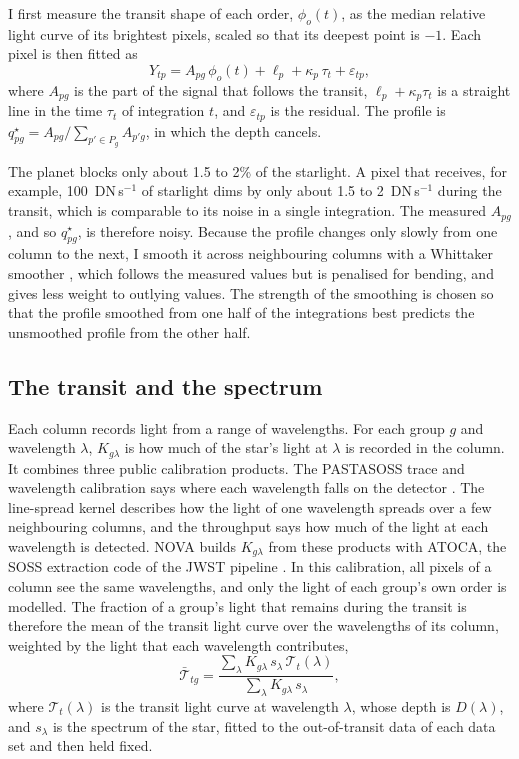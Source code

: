 I first measure the transit shape of each order, $\phi_o(t)$, as the median
relative light curve of its brightest pixels, scaled so that its deepest point
is $-1$. Each pixel is then fitted as
\begin{equation}
 Y_{tp} = A_{pg}\,\phi_{o}(t) + \ell_p + \kappa_p\,\tau_t + \varepsilon_{tp},
 \label{eq:qstar-fit}
\end{equation}
where $A_{pg}$ is the part of the signal that follows the transit,
$\ell_p+\kappa_p\tau_t$ is a straight line in the time $\tau_t$ of integration
$t$, and $\varepsilon_{tp}$ is the residual. The profile is $q^\star_{pg}=A_{pg}/\sum_{p'\in P_g}A_{p'g}$, in
which the depth cancels.

The planet blocks only about 1.5 to 2\% of the starlight. A pixel that
receives, for example, 100~DN\,s$^{-1}$ of starlight dims by only about 1.5
to 2~DN\,s$^{-1}$ during the transit, which is comparable to its noise in a single
integration. The measured $A_{pg}$, and so $q^\star_{pg}$, is therefore
noisy. Because the profile changes only slowly from one column to the next, I
smooth it across neighbouring columns with a Whittaker smoother \citep{Eilers2003}, which follows the measured values but is penalised for bending, and gives less weight to outlying values. The strength of
the smoothing is chosen so that the profile smoothed from one half of the
integrations best predicts the unsmoothed profile from the other half.

\subsection{The transit and the spectrum}
\label{sec:transit}

Each column records light from a range of wavelengths. For each group $g$ and
wavelength $\lambda$, $K_{g\lambda}$ is how much of the star's light at
$\lambda$ is recorded in the column. It combines three public calibration
products. The PASTASOSS trace and wavelength calibration says where
each wavelength falls on the detector
\citep{BainesEtAl2023Trace,BainesEtAl2023Wavelength}. The line-spread kernel
describes how the light of one wavelength spreads over a few neighbouring
columns, and the throughput says how much of the light at each wavelength is
detected. NOVA builds $K_{g\lambda}$ from these products with ATOCA, the SOSS extraction code of the JWST
pipeline \citep{DarveauBernierEtAl2022,JWSTPipeline2025}. In this
calibration, all pixels of a column see the same wavelengths, and only the
light of each group's own order is modelled. The fraction of a group's light that remains during the transit is therefore
the mean of the transit light curve over the wavelengths of its column,
weighted by the light that each wavelength contributes,
\begin{equation}
 \bar{\mathcal{T}}_{tg}
 = \frac{\sum_{\lambda} K_{g\lambda}\, s_\lambda\, \mathcal{T}_t(\lambda)}
        {\sum_{\lambda} K_{g\lambda}\, s_\lambda},
 \label{eq:group-transit}
\end{equation}
where $\mathcal{T}_t(\lambda)$ is the transit light curve at wavelength
$\lambda$, whose depth is $D(\lambda)$, and $s_\lambda$ is the spectrum of the
star, fitted to the out-of-transit data of each data set and then held
fixed.

